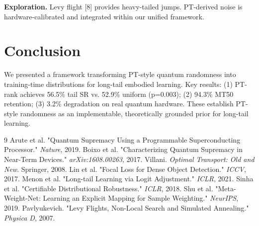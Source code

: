 \documentclass[10pt,twocolumn]{article}
\begin{document}
\textbf{Exploration.} Levy flight [8] provides heavy-tailed jumps. PT-derived noise is hardware-calibrated and integrated within our unified framework.

\section{Conclusion}

We presented a framework transforming PT-style quantum randomness into training-time distributions for long-tail embodied learning. Key results: (1) PT-rank achieves 56.5\% tail SR vs. 52.9\% uniform (p=0.003); (2) 94.3\% MT50 retention; (3) 3.2\% degradation on real quantum hardware. These establish PT-style randomness as an implementable, theoretically grounded prior for long-tail learning.

\begin{thebibliography}{9}
 Arute et al. "Quantum Supremacy Using a Programmable Superconducting Processor." \textit{Nature}, 2019.
 Boixo et al. "Characterizing Quantum Supremacy in Near-Term Devices." \textit{arXiv:1608.00263}, 2017.
 Villani. \textit{Optimal Transport: Old and New}. Springer, 2008.
 Lin et al. "Focal Loss for Dense Object Detection." \textit{ICCV}, 2017.
 Menon et al. "Long-tail Learning via Logit Adjustment." \textit{ICLR}, 2021.
 Sinha et al. "Certifiable Distributional Robustness." \textit{ICLR}, 2018.
 Shu et al. "Meta-Weight-Net: Learning an Explicit Mapping for Sample Weighting." \textit{NeurIPS}, 2019.
 Pavlyukevich. "Levy Flights, Non-Local Search and Simulated Annealing." \textit{Physica D}, 2007.
\end{thebibliography}
\end{document}
